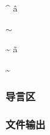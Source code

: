 \documentclass{ctexart}
\begin{document}
            {\rmfamily {}}

            \^{} \^a

            $\sim$
            
            \~{} \~a
            
            \textasciitilde

        \subsubsection{导言区}

        \subsubsection{文件输出}
\end{document}
